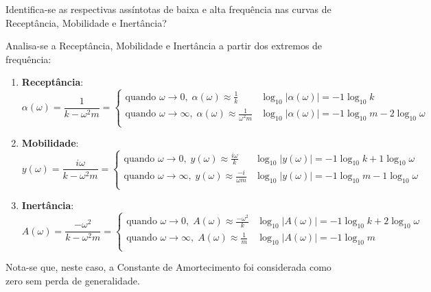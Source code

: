 \documentclass{article}
\begin{document}
\newpage
\begin{exercise}\label{ex5}
    Identifica-se as respectivas assíntotas de baixa e alta frequência nas curvas de Receptância, Mobilidade e Inertância?
\end{exercise}
\begin{resolution}
    Analisa-se a Receptância, Mobilidade e Inertância a partir dos extremos de frequência:
    \begin{enumerate}
        \item \textbf{Receptância}:
        \begin{equation}
            \alpha(\omega) = \frac{1}{k - \omega^2m} = 
            \begin{cases}\nonumber
                \text{quando } \omega\to 0,     \;\alpha(\omega) \approx \frac{1}{k}         & \log_{10} |\alpha(\omega)| = -1\log_{10} k\\
                \text{quando } \omega\to \infty,\;\alpha(\omega) \approx \frac{1}{\omega^2m} & \log_{10} |\alpha(\omega)| = -1\log_{10} m -2\log_{10} \omega\\
            \end{cases}
        \end{equation}

        \item \textbf{Mobilidade}:
        \begin{equation}
            y(\omega) = \frac{i\omega}{k - \omega^2m} = 
            \begin{cases}\nonumber
                \text{quando } \omega\to 0,     \;y(\omega) \approx \frac{i\omega}{k}   & \log_{10} |y(\omega)| = -1\log_{10} k +1\log_{10} \omega \\
                \text{quando } \omega\to \infty,\;y(\omega) \approx \frac{-i}{\omega m} & \log_{10} |y(\omega)| = -1\log_{10} m -1\log_{10} \omega\\
            \end{cases}
        \end{equation}

        \item \textbf{Inertância}:
        \begin{equation}
            A(\omega) = \frac{-\omega^2}{k - \omega^2m} = 
            \begin{cases}\nonumber
                \text{quando } \omega\to 0,     \;A(\omega) \approx \frac{-\omega^2}{k} & \log_{10} |A(\omega)| = -1\log_{10} k +2\log_{10} \omega\\
                \text{quando } \omega\to \infty,\;A(\omega) \approx \frac{1}{m}         & \log_{10} |A(\omega)| = -1\log_{10} m\\
            \end{cases}
        \end{equation}
    \end{enumerate}
    Nota-se que, neste caso, a Constante de Amortecimento foi considerada como zero sem perda de generalidade.\\


\end{resolution}
\end{document}
